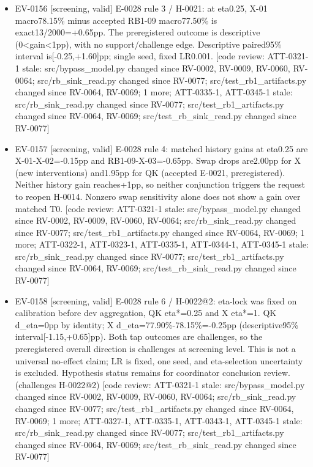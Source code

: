 \documentclass[11pt]{article}
\begin{document}
\begin{itemize}
\item EV-0156 [screening, valid] E-0028 rule 3 / H-0021: at eta0.25, X-01 macro78.15\% minus accepted RB1-09 macro77.50\% is exact13/2000=+0.65pp. The preregistered outcome is descriptive (0\textless{}gain\textless{}1pp), with no support/challenge edge. Descriptive paired95\% interval is[-0.25,+1.60]pp; single seed, fixed LR0.001. [code review: ATT-0321-1 stale: src/bypass\_model.py changed since RV-0002, RV-0009, RV-0060, RV-0064; src/rb\_sink\_read.py changed since RV-0077; src/test\_rb1\_artifacts.py changed since RV-0064, RV-0069; 1 more; ATT-0335-1, ATT-0345-1 stale: src/rb\_sink\_read.py changed since RV-0077; src/test\_rb1\_artifacts.py changed since RV-0064, RV-0069; src/test\_rb\_sink\_read.py changed since RV-0077]
\item EV-0157 [screening, valid] E-0028 rule 4: matched history gains at eta0.25 are X-01-X-02=-0.15pp and RB1-09-X-03=-0.65pp. Swap drops are2.00pp for X (new interventions) and1.95pp for QK (accepted E-0021, preregistered). Neither history gain reaches+1pp, so neither conjunction triggers the request to reopen H-0014. Nonzero swap sensitivity alone does not show a gain over matched T0. [code review: ATT-0321-1 stale: src/bypass\_model.py changed since RV-0002, RV-0009, RV-0060, RV-0064; src/rb\_sink\_read.py changed since RV-0077; src/test\_rb1\_artifacts.py changed since RV-0064, RV-0069; 1 more; ATT-0322-1, ATT-0323-1, ATT-0335-1, ATT-0344-1, ATT-0345-1 stale: src/rb\_sink\_read.py changed since RV-0077; src/test\_rb1\_artifacts.py changed since RV-0064, RV-0069; src/test\_rb\_sink\_read.py changed since RV-0077]
\item EV-0158 [screening, valid] E-0028 rule 6 / H-0022@2: eta-lock was fixed on calibration before dev aggregation, QK eta*=0.25 and X eta*=1. QK d\_eta=0pp by identity; X d\_eta=77.90\%-78.15\%=-0.25pp (descriptive95\% interval[-1.15,+0.65]pp). Both tap outcomes are challenges, so the preregistered overall direction is challenges at screening level. This is not a universal no-effect claim; LR is fixed, one seed, and eta-selection uncertainty is excluded. Hypothesis status remains for coordinator conclusion review. (challenges H-0022@2) [code review: ATT-0321-1 stale: src/bypass\_model.py changed since RV-0002, RV-0009, RV-0060, RV-0064; src/rb\_sink\_read.py changed since RV-0077; src/test\_rb1\_artifacts.py changed since RV-0064, RV-0069; 1 more; ATT-0327-1, ATT-0335-1, ATT-0343-1, ATT-0345-1 stale: src/rb\_sink\_read.py changed since RV-0077; src/test\_rb1\_artifacts.py changed since RV-0064, RV-0069; src/test\_rb\_sink\_read.py changed since RV-0077]

\end{itemize}
\end{document}
